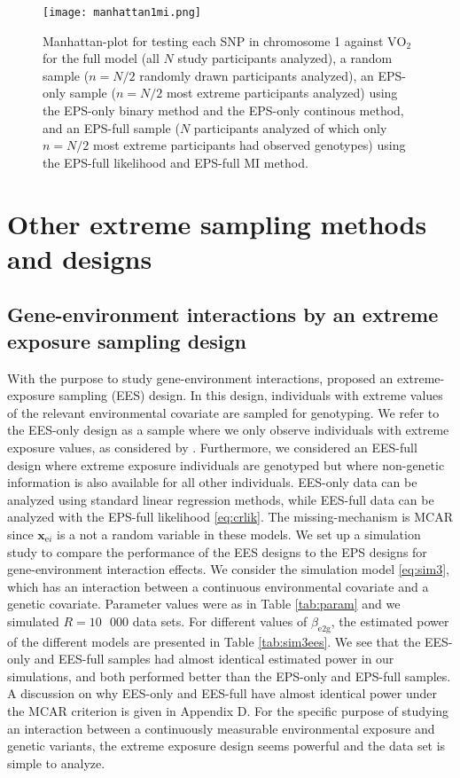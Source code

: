 \documentclass[10pt,a4paper]{article}
\def\bxei{\mathbf{x}_{\text{e}i}}
\begin{document}
\begin{figure}[h]
	\centering
	\texttt{[image: manhattan1mi.png]}
	\caption{Manhattan-plot for testing each SNP in chromosome 1 against $\text{VO}_2$ for the full model (all $N$ study participants analyzed), a random sample ($n = N/2$ randomly drawn participants analyzed), an EPS-only sample ($n=N/2$ most extreme participants analyzed) using the EPS-only binary method and the EPS-only continous method, and an EPS-full sample ($N$ participants analyzed of which only $n=N/2$ most extreme participants had observed genotypes) using the EPS-full likelihood and EPS-full MI method.}
	\label{fig:manhattan1}
\end{figure}

\section{Other extreme sampling methods and designs}

\subsection{Gene-environment interactions by an extreme exposure sampling design}
With the purpose to study gene-environment interactions, \cite{boks2007ees} proposed an extreme-exposure sampling (EES) design. In this design, individuals with extreme values of the relevant environmental covariate are sampled for genotyping. We refer to the EES-only design as a sample where we only observe individuals with extreme exposure values, as considered by \cite{boks2007ees}. Furthermore, we considered an EES-full design where extreme exposure individuals are genotyped but where non-genetic information is also available for all other individuals. EES-only data can be analyzed using standard linear regression methods, while EES-full data can be analyzed with the EPS-full likelihood \eqref{eq:crlik}. The missing-mechanism is MCAR since $\bxei$ is a not a random variable in these models. We set up a simulation study to compare the performance of the EES designs to the EPS designs for gene-environment interaction effects. We consider the simulation model \eqref{eq:sim3}, which has an interaction between a continuous environmental covariate and a genetic covariate. Parameter values were as in Table \ref{tab:param} and we simulated $R = 10 \text{ } 000$ data sets. For different values of $\beta_{\text{e}2\text{g}}$, the estimated power of the different models are presented in Table \ref{tab:sim3ees}. We see that the EES-only and EES-full samples had almost identical estimated power in our simulations, and both performed better than the EPS-only and EPS-full samples. A discussion on why EES-only and EES-full have almost identical power under the MCAR criterion is given in Appendix D. For the specific purpose of studying an interaction between a continuously measurable environmental exposure and genetic variants, the extreme exposure design seems powerful and the data set is simple to analyze.
\end{document}
